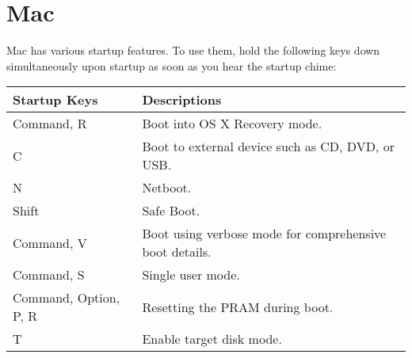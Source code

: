 \chapter{Mac}
\thispagestyle{fancy}
\lstset{language=Bash, style=bash}

\begin{fancybox}{}	
	Mac has various startup features. To use them, hold the following keys down simultaneously upon startup as soon as you hear the startup chime:
	\begin{center}
		\begin{tabular}{l|l}
			Startup Keys & Descriptions \\
			\hline
			Command, R & Boot into OS X Recovery mode. \\
			C & Boot to external device such as CD, DVD, or USB. \\
			N & Netboot. \\
			Shift & Safe Boot. \\
			Command, V & Boot using verbose mode for comprehensive boot details. \\
			Command, S & Single user mode. \\
			Command, Option, P, R & Resetting the PRAM during boot. \\
			T & Enable target disk mode.
		\end{tabular}
	\end{center}
\end{fancybox}



